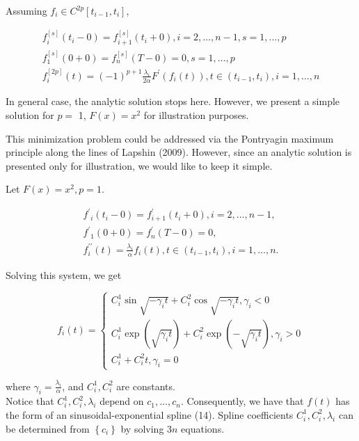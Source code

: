 \documentclass[10pt]{article}
\begin{document}
Assuming $f_{i} \in C^{2 p}\left[t_{i-1}, t_{i}\right]$,


\begin{gather*}
f_{i}^{[s]}\left(t_{i}-0\right)=f_{i+1}^{[s]}\left(t_{i}+0\right), i=2, \ldots, n-1, s=1, \ldots, p  \tag{8}\\
f_{1}^{[s]}(0+0)=f_{n}^{[s]}(T-0)=0, s=1, \ldots, p  \tag{9}\\
f_{i}^{[2 p]}(t)=(-1)^{p+1} \frac{\lambda_{i}}{2 \alpha} F^{\prime}\left(f_{i}(t)\right), t \in\left(t_{i-1}, t_{i}\right), i=1, \ldots, n \tag{10}
\end{gather*}


In general case, the analytic solution stops here. However, we present a simple solution for $p=$ 1, $F(x)=x^{2}$ for illustration purposes.

This minimization problem could be addressed via the Pontryagin maximum principle along the lines of Lapshin (2009). However, since an analytic solution is presented only for illustration, we would like to keep it simple.

Let $F(x)=x^{2}, p=1$.


\begin{gather*}
f^{\prime}{ }_{i}\left(t_{i}-0\right)=f_{i+1}^{\prime}\left(t_{i}+0\right), i=2, \ldots, n-1,  \tag{11}\\
{f^{\prime}}_{1}(0+0)=f_{n}^{\prime}(T-0)=0,  \tag{12}\\
f_{i}^{\prime \prime}(t)=\frac{\lambda_{i}}{\alpha} f_{i}(t), t \in\left(t_{i-1}, t_{i}\right), i=1, \ldots, n . \tag{13}
\end{gather*}


Solving this system, we get

\[
f_{i}(t)=\left\{\begin{array}{c}
C_{i}^{1} \sin \sqrt{-\gamma_{i} t}+C_{i}^{2} \cos \sqrt{-\gamma_{i} t}, \gamma_{i}<0  \tag{14}\\
C_{i}^{1} \exp \left(\sqrt{\gamma_{i} t}\right)+C_{i}^{2} \exp \left(-\sqrt{\gamma_{i} t}\right), \gamma_{i}>0 \\
C_{i}^{1}+C_{i}^{2} t, \gamma_{i}=0
\end{array}\right.
\]

where $\gamma_{i}=\frac{\lambda_{i}}{\alpha}$, and $C_{i}^{1}, C_{i}^{2}$ are constants.\\
Notice that $C_{i}^{1}, C_{i}^{2}, \lambda_{i}$ depend on $c_{1}, \ldots, c_{n}$. Consequently, we have that $f(t)$ has the form of an sinusoidal-exponential spline (14). Spline coefficients $C_{i}^{1}, C_{i}^{2}, \lambda_{i}$ can be determined from $\left\{c_{i}\right\}$ by solving $3 n$ equations.
\end{document}
